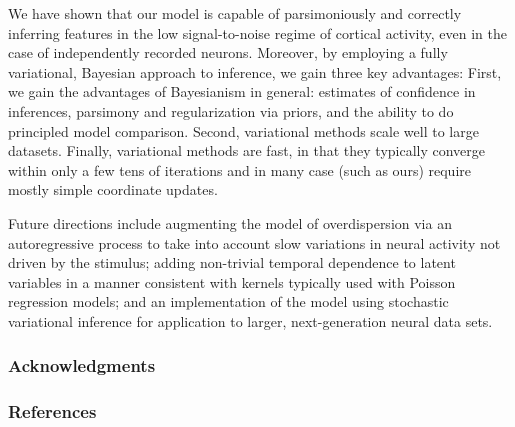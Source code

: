 \documentclass{article} %
\begin{document}
We have shown that our model is capable of parsimoniously and correctly inferring features in the low signal-to-noise regime of cortical activity, even in the case of independently recorded neurons. Moreover, by employing a fully variational, Bayesian approach to inference, we gain three key advantages: First, we gain the advantages of Bayesianism in general: estimates of confidence in inferences, parsimony and regularization via priors, and the ability to do principled model comparison. Second, variational methods scale well to large datasets. Finally, variational methods are fast, in that they typically converge within only a few tens of iterations and in many case (such as ours) require mostly simple coordinate updates. %

Future directions include augmenting the model of overdispersion via an autoregressive process to take into account slow variations in neural activity not driven by the stimulus; adding non-trivial temporal dependence to latent variables in a manner consistent with kernels typically used with Poisson regression models; and an implementation of the model using stochastic variational inference for application to larger, next-generation neural data sets.

\subsubsection*{Acknowledgments}


\newpage
\subsubsection*{References}
\begingroup
\footnotesize
\renewcommand{\section}[2]{}
{}

\endgroup
\end{document}
